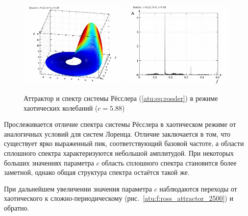\begin{figure}[ht!]
\begin{center}
  \includegraphics[width=0.49\textwidth]{p/cha/ross/ross0-p_xyz_c=05x88.png}
  \hfill
  \includegraphics[width=0.49\textwidth]{p/cha/ross/ross_f-p_f_c=05x88.png}
\end{center}
  \caption{Аттрактор и спектр системы Рёсслера (\ref{atu:eq:rossler}) в режиме хаотических колебаний ($c=5.88$)}
\label{atu:f:ross_attractor_0588}
\end{figure}

Прослеживается отличие спектра системы Рёсслера в хаотическом режиме
от аналогичных условий для систем Лоренца. Отличие заключается в том, что
существует ярко выраженный пик, соответствующий базовой частоте,
а области сплошного спектра характеризуются небольшой амплитудой.
При некоторых больших значениях параметра $c$
область сплошного спектра становится более заметной,
однако общая структура спектра остаётся такой же.


При дальнейшем увеличении значения параметра \(c\)
наблюдаются переходы от хаотического к сложно-периодическому
(рис.~\ref{atu:f:ross_attractor_2500})
и  обратно.

